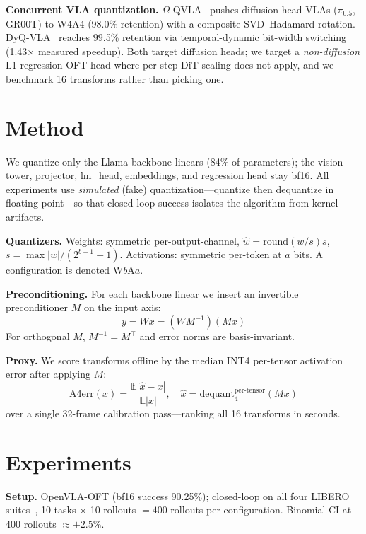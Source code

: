 \documentclass[conference]{IEEEtran}
\begin{document}
\textbf{Concurrent VLA quantization.}
$\Omega$-QVLA~\cite{omegaqvla} pushes diffusion-head VLAs ($\pi_{0.5}$, GR00T) to W4A4 (98.0\%
retention) with a composite SVD--Hadamard rotation. DyQ-VLA~\cite{dyqvla} reaches 99.5\% retention
via temporal-dynamic bit-width switching (1.43$\times$ measured speedup). Both target diffusion
heads; we target a \emph{non-diffusion} L1-regression OFT head where per-step DiT scaling does not
apply, and we benchmark 16 transforms rather than picking one.

\section{Method}
\label{sec:method}

We quantize only the Llama backbone linears (84\% of parameters); the vision tower, projector,
lm\_head, embeddings, and regression head stay bf16. All experiments use \emph{simulated}
(fake) quantization---quantize then dequantize in floating point---so that closed-loop success
isolates the algorithm from kernel artifacts.

\textbf{Quantizers.}
Weights: symmetric per-output-channel, $\hat{w} = \mathrm{round}(w/s)s$, $s = \max|w|/(2^{b-1}-1)$.
Activations: symmetric per-token at $a$ bits. A configuration is denoted W$b$A$a$.

\textbf{Preconditioning.}
For each backbone linear we insert an invertible preconditioner $M$ on the input axis:
\begin{equation}
  y = Wx = (WM^{-1})(Mx)
\end{equation}
For orthogonal $M$, $M^{-1}=M^\top$ and error norms are basis-invariant.

\textbf{Proxy.}
We score transforms offline by the median INT4 per-tensor activation error after applying $M$:
\begin{equation}
  \mathrm{A4err}(x) = \frac{\mathbb{E}|\hat{x} - x|}{\mathbb{E}|x|}, \quad
  \hat{x} = \mathrm{dequant}_4^{\mathrm{per\text{-}tensor}}(Mx)
\end{equation}
over a single 32-frame calibration pass---ranking all 16 transforms in seconds.

\section{Experiments}

\textbf{Setup.} OpenVLA-OFT (bf16 success 90.25\%); closed-loop on all four LIBERO
suites~\cite{libero}, 10 tasks $\times$ 10 rollouts $= 400$ rollouts per configuration.
Binomial CI at 400 rollouts $\approx \pm 2.5\%$.
\end{document}
